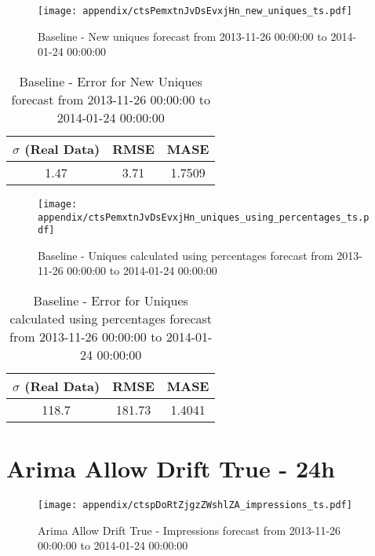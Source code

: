 \begin{figure}[H] \begin{center} \leavevmode
\texttt{[image: appendix/ctsPemxtnJvDsEvxjHn\_new\_uniques\_ts.pdf]} \caption[]{
Baseline - New uniques forecast from 2013-11-26 00:00:00 to 2014-01-24 00:00:00} \label{fig:appendix/ctsPemxtnJvDsEvxjHn_new_uniques_ts.pdf} \end{center}
\end{figure}

\begin{table}[H]
\centering
\footnotesize
\begin{tabular}{ccc}
$\sigma$ (Real Data) & RMSE & MASE   \\ \hline
1.47 & 3.71 & 1.7509 \\
\end{tabular}

\vspace{0.5cm}

\caption[]{
Baseline - Error for New Uniques forecast from 2013-11-26 00:00:00 to 2014-01-24 00:00:00}
\end{table}

\begin{figure}[H] \begin{center} \leavevmode
\texttt{[image: appendix/ctsPemxtnJvDsEvxjHn\_uniques\_using\_percentages\_ts.pdf]} \caption[]{
Baseline - Uniques calculated using percentages forecast from 2013-11-26 00:00:00 to 2014-01-24 00:00:00} \label{fig:appendix/ctsPemxtnJvDsEvxjHn_uniques_using_percentages_ts.pdf} \end{center}
\end{figure}

\begin{table}[H]
\centering
\footnotesize
\begin{tabular}{ccc}
$\sigma$ (Real Data) & RMSE & MASE   \\ \hline
118.7 & 181.73 & 1.4041 \\
\end{tabular}

\vspace{0.5cm}

\caption[]{
Baseline - Error for Uniques calculated using percentages forecast from 2013-11-26 00:00:00 to 2014-01-24 00:00:00}
\end{table}

\section{Arima Allow Drift True - 24h}
\begin{figure}[H] \begin{center} \leavevmode
\texttt{[image: appendix/ctspDoRtZjgzZWshlZA\_impressions\_ts.pdf]} \caption[]{
Arima Allow Drift True - Impressions forecast from 2013-11-26 00:00:00 to 2014-01-24 00:00:00} \label{fig:appendix/ctspDoRtZjgzZWshlZA_impressions_ts.pdf} \end{center}
\end{figure}

